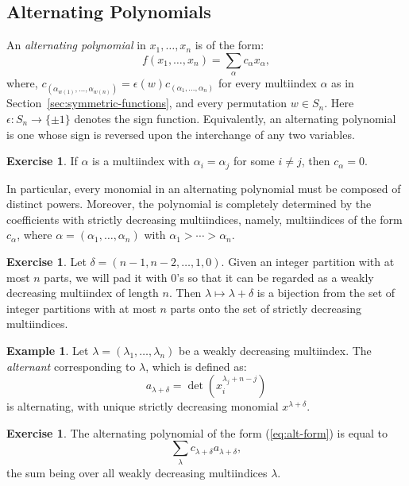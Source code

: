 \documentclass[11pt]{amsproc}
\theoremstyle{definition}
\theoremstyle{example}
\newtheorem{example}[theorem]{Example}
\newtheorem{exercise}[theorem]{Exercise}
\begin{document}
\subsection{Alternating Polynomials}
\label{sec:alt-poly}
An \emph{alternating polynomial} in $x_1,\dotsc, x_n$ is of the form:
\begin{equation}
  \label{eq:alt-form}
  f(x_1,\dotsc,x_n) = \sum_{\alpha} c_\alpha x_\alpha,
\end{equation}
where, $c_{(\alpha_{w(1)},\dotsc,\alpha_{w(n)})} = \epsilon(w)c_{(\alpha_1,\dotsc,\alpha_n)}$ for every multiindex $\alpha$ as in Section~\ref{sec:symmetric-functions}, and every permutation $w\in S_n$.
Here $\epsilon:S_n\to \{\pm 1\}$ denotes the sign function.
Equivalently, an alternating polynomial is one whose sign is reversed upon the interchange of any two variables.
\begin{exercise}
  If $\alpha$ is a multiindex with $\alpha_i=\alpha_j$ for some $i\neq j$, then $c_\alpha = 0$.
\end{exercise}
In particular, every monomial in an alternating polynomial must be composed of distinct powers.
Moreover, the polynomial is completely determined by the coefficients with strictly decreasing multiindices, namely, multiindices of the form $c_\alpha$, where $\alpha=(\alpha_1,\dotsc,\alpha_n)$ with $\alpha_1>\dotsb>\alpha_n$.
\begin{exercise}
  Let $\delta=(n-1,n-2,\dotsc,1, 0)$.
  Given an integer partition with at most $n$ parts, we will pad it with $0$'s so that it can be regarded as a weakly decreasing multiindex of length $n$.
  Then $\lambda\mapsto \lambda+\delta$ is a bijection from the set of integer partitions with at most $n$ parts onto the set of strictly decreasing multiindices.
\end{exercise}
\begin{example}
  Let $\lambda = (\lambda_1,\dotsc, \lambda_n)$ be a weakly decreasing multiindex.
  The \emph{alternant} corresponding to $\lambda$, which is defined as:
  \begin{displaymath}
    a_{\lambda+\delta} = \det(x_i^{\lambda_j + n - j})
  \end{displaymath}
  is alternating, with unique strictly decreasing monomial $x^{\lambda+\delta}$.
\end{example}
\begin{exercise}
  \label{exercise:alt-basis}
  The alternating polynomial of the form \textup{(\ref{eq:alt-form})} is equal to  \begin{displaymath}
    \sum_{\lambda} c_{\lambda+\delta} a_{\lambda+\delta},
  \end{displaymath}
  the sum being over all weakly decreasing multiindices $\lambda$.
\end{exercise}
\end{document}
